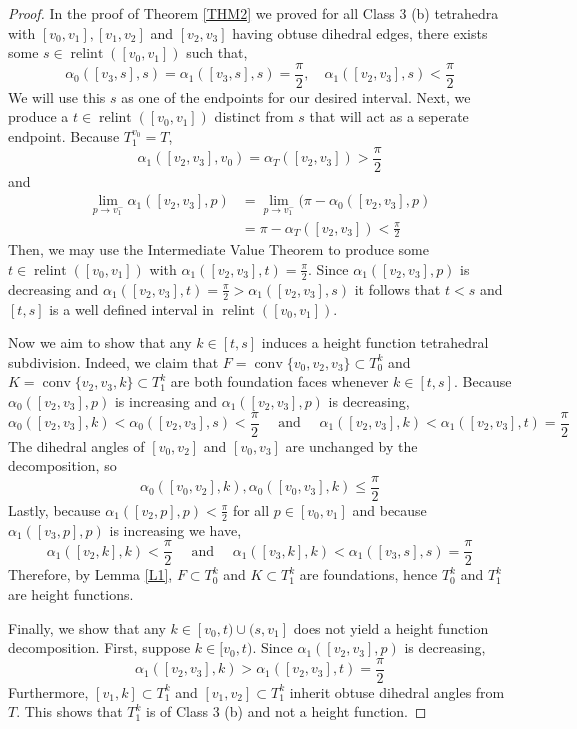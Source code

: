 \documentclass{mainresearch}
\begin{document}
\begin{proof}
	In the proof of Theorem \ref{THM2} we proved for all Class 3 (b) tetrahedra  with $[v_0,v_1], [v_1,v_2]$ and $[v_2,v_3]$ having obtuse dihedral edges, there exists some $s\in \operatorname{relint}([v_0,v_1])$ such that,
	\[
	\alpha_0([v_3,s],s)=\alpha_1([v_3,s],s) = \frac{\pi}{2}, \quad \alpha_1([v_2,v_3],s) < \frac{\pi}{2}
	\]
	We will use this $s$ as one of the endpoints for our desired interval. Next, we produce a $t\in \operatorname{relint}([v_0,v_1])$ distinct from $s$ that will act as a seperate endpoint. Because $T_1^{v_0} = T$,
	\[
	\alpha_1([v_2,v_3],v_0) = \alpha_T([v_2,v_3]) > \frac{\pi}{2}
	\]
	and
	\begin{align*}
		\lim_{p \to v_1^-}\alpha_1([v_2,v_3],p) &= \lim_{p \to v_1^-}(\pi - \alpha_0([v_2,v_3],p) \\
		&= \pi - \alpha_T([v_2,v_3]) < \frac{\pi}{2}
	\end{align*}
	Then, we may use the Intermediate Value Theorem to produce some $t\in\operatorname{relint}([v_0,v_1])$ with $\alpha_1([v_2,v_3],t) = \frac{\pi}{2}$.
	Since $\alpha_{1}([v_2,v_3],p)$ is decreasing and $\alpha_1([v_2,v_3],t) = \frac{\pi}{2} > \alpha_{1}([v_2,v_3],s)$ it follows that $t<s$ and $[t,s]$ is a well defined interval in $\operatorname{relint}([v_0,v_1])$. 
	
	Now we aim to show that any $k\in [t,s]$ induces a height function tetrahedral subdivision. Indeed, we claim that $F=\operatorname{conv}\{v_0,v_2,v_3\}\subset T_0^k$ and $K=\operatorname{conv}\{v_2,v_3,k\}\subset T_1^k$ are both foundation faces whenever $k\in [t,s]$. Because $\alpha_{0}([v_2,v_3],p)$ is increasing and $\alpha_{1}([v_2,v_3],p)$ is decreasing,
	\[
	\alpha_{0}([v_2,v_3],k) < \alpha_{0}([v_2,v_3],s) < \frac{\pi}{2} \quad \text{ and } \quad \alpha_{1}([v_2,v_3],k) < \alpha_{1}([v_2,v_3],t) = \frac{\pi}{2}
	\]
	The dihedral angles of $[v_0,v_2]$ and $[v_0,v_3]$ are unchanged by the decomposition, so
	\[
	\alpha_{0}([v_0,v_2],k), \alpha_0([v_0,v_3],k) \le \frac{\pi}{2}
	\]
	Lastly, because $\alpha_{1}([v_2,p],p) < \frac{\pi}{2}$ for all $p\in [v_0,v_1]$ and because $\alpha_{1}([v_3,p],p)$ is increasing we have,
	\[
	\alpha_{1}([v_2,k],k) < \frac{\pi}{2} \quad \text{ and } \quad \alpha_{1}([v_3,k],k) < \alpha_{1}([v_3,s],s) = \frac{\pi}{2}
	\]
	Therefore, by Lemma \ref{L1}, $F\subset T_0^k$ and $K\subset T_1^k$ are foundations, hence $T_0^k$ and $T_1^k$ are height functions.
	
	Finally, we show that any $k\in [v_0,t)\cup (s,v_1]$ does not yield a height function decomposition. First, suppose $k\in [v_0,t)$. Since $\alpha_{1}([v_2,v_3],p)$ is decreasing,
	\[
	\alpha_{1}([v_2,v_3],k) > \alpha_{1}([v_2,v_3],t) = \frac{\pi}{2}
	\]
	Furthermore, $[v_1,k]\subset T_1^k$ and $[v_1,v_2]\subset T_1^k$ inherit obtuse dihedral angles from $T$. This shows that $T_1^k$ is of Class 3 (b) and not a height function.
	

\end{proof}
\end{document}
